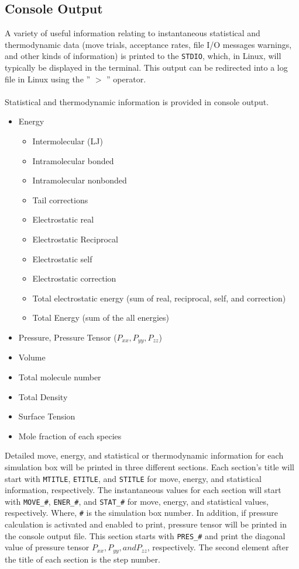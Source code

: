 \subsection{Console Output}
A variety of useful information relating to instantaneous statistical and thermodynamic data (move trials, acceptance rates, file I/O messages warnings, and other kinds of information) is printed to the \texttt{STDIO}, which, in Linux, will typically be displayed in the terminal.  This output can be redirected into a log file in Linux using the '' $>$ '' operator.\\\\
Statistical and thermodynamic information is provided in console output.\\
\begin{itemize}
\item Energy
	\begin{itemize}
	\item Intermolecular (LJ)
	\item Intramolecular bonded
	\item Intramolecular nonbonded
	\item Tail corrections
	\item Electrostatic real
	\item Electrostatic Reciprocal
	\item Electrostatic self
	\item Electrostatic correction
	\item Total electrostatic energy (sum of real, reciprocal, self, and correction)
	\item Total Energy (sum of the all energies)
	\end{itemize}
\item Pressure, Pressure Tensor ($P_{xx}, P_{yy}, P_{zz}$)
\item Volume
\item Total molecule number
\item Total Density
\item Surface Tension
\item Mole fraction of each species
\end{itemize}
Detailed move, energy, and statistical or thermodynamic information for each simulation box will be printed in three different sections. Each section’s title will start with \texttt{MTITLE}, \texttt{ETITLE}, and \texttt{STITLE} for move, energy, and statistical information, respectively. The instantaneous values for each section will start with \texttt{MOVE\_\#}, \texttt{ENER\_\#}, and \texttt{STAT\_\#} for move, energy, and statistical values, respectively. Where, \texttt{\#} is the simulation box number.  In addition, if pressure calculation is activated and enabled to print, pressure tensor will be printed in the console output file.  This section starts with \texttt{PRES\_\#} and print the diagonal value of pressure tensor $P_{xx}, P_{yy}, and P_{zz}$, respectively.  The second element after the title of each section is the step number.
